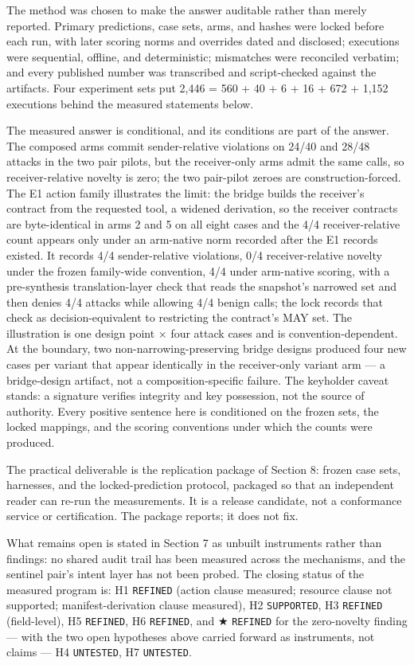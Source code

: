 \documentclass[
  10pt,
]{article}
\let\origtexttt\texttt
\renewcommand{\texttt}[1]{{\upshape\origtexttt{#1}}}
\renewcommand{\_}{\allowbreak\origunderscore}
\begin{document}
The method was chosen to make the answer auditable rather than merely
reported. Primary predictions, case sets, arms, and hashes were locked
before each run, with later scoring norms and overrides dated and
disclosed; executions were sequential, offline, and deterministic;
mismatches were reconciled verbatim; and every published number was
transcribed and script-checked against the artifacts. Four experiment
sets put 2,446 = 560 + 40 + 6 + 16 + 672 + 1,152 executions behind the
measured statements below.

The measured answer is conditional, and its conditions are part of the
answer. The composed arms commit sender-relative violations on 24/40 and
28/48 attacks in the two pair pilots, but the receiver-only arms admit
the same calls, so receiver-relative novelty is zero; the two pair-pilot
zeroes are construction-forced. The E1 action family illustrates the
limit: the bridge builds the receiver's contract from the requested
tool, a widened derivation, so the receiver contracts are byte-identical
in arms 2 and 5 on all eight cases and the 4/4 receiver-relative count
appears only under an arm-native norm recorded after the E1 records
existed. It records 4/4 sender-relative violations, 0/4
receiver-relative novelty under the frozen family-wide convention, 4/4
under arm-native scoring, with a pre-synthesis translation-layer check
that reads the snapshot's narrowed set and then denies 4/4 attacks while
allowing 4/4 benign calls; the lock records that check as
decision-equivalent to restricting the contract's MAY set. The
illustration is one design point × four attack cases and is
convention-dependent. At the boundary, two non-narrowing-preserving
bridge designs produced four new cases per variant that appear
identically in the receiver-only variant arm --- a bridge-design
artifact, not a composition-specific failure. The keyholder caveat
stands: a signature verifies integrity and key possession, not the
source of authority. Every positive sentence here is conditioned on the
frozen sets, the locked mappings, and the scoring conventions under
which the counts were produced.

The practical deliverable is the replication package of Section 8:
frozen case sets, harnesses, and the locked-prediction protocol,
packaged so that an independent reader can re-run the measurements. It
is a release candidate, not a conformance service or certification. The
package reports; it does not fix.

What remains open is stated in Section 7 as unbuilt instruments rather
than findings: no shared audit trail has been measured across the
mechanisms, and the sentinel pair's intent layer has not been probed.
The closing status of the measured program is: H1 \texttt{REFINED}
(action clause measured; resource clause not supported;
manifest-derivation clause measured), H2 \texttt{SUPPORTED}, H3
\texttt{REFINED} (field-level), H5 \texttt{REFINED}, H6
\texttt{REFINED}, and ★ \texttt{REFINED} for the zero-novelty finding
--- with the two open hypotheses above carried forward as instruments,
not claims --- H4 \texttt{UNTESTED}, H7 \texttt{UNTESTED}.
\end{document}

